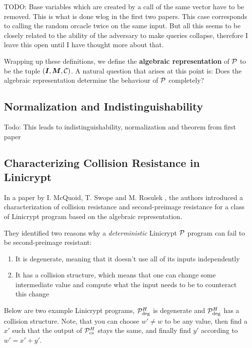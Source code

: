 TODO: Base variables which are created by a call of the same vector have to be removed.
This is what is done wlog in the first two papers.
This case corresponds to calling the random orcacle twice on the same input.
But all this seems to be closely related to the ability of the adversary to make queries collapse,
therefore I leave this open until I have thought more about that.

Wrapping up these definitions,
we define the \textbf{algebraic representation} of $\P$ to be the tuple $(\Inp, \M, \C)$.
A natural question that arises at this point is:
Does the algebraic representation determine the behaviour of $\P$ completely?

\subsection{Normalization and Indistinguishability}

Todo: This leads to indistinguishability, normalization and theorem from first paper

\subsection{Characterizing Collision Resistance in Linicrypt}

In a paper by I. McQuoid, T. Swope and M. Rosulek
\cite[Characterizing Collision and Second-Preimage Resistance in Linicrypt]{RMS20},
the authors introduced a characterization of collision resistance
and second-preimage resistance for a class of Linicrypt program based on the algebraic representation.

They identified two reasons why a \textit{deterministic} Linicrypt $\P$ program can fail to be second-preimage resistant:
\begin{enumerate}
  \item It is degenerate, meaning that it doesn't use all of its inputs independently
  \item It has a collision structure,
    which means that one can change some intermediate value and compute what the input needs to be to counteract this change
\end{enumerate}

Below are two example Linicrypt programs, $\P^\H_\textrm{deg}$ is degenerate and $\P^\H_\textrm{deg}$ has a collision structure.
Note, that you can choose $w' \neq w$ to be any value,
then find a $x'$ such that the output of $\P^\H_{\textrm{cs}}$ stays the same,
and finally find $y'$ according to $w' = x' + y'$.

